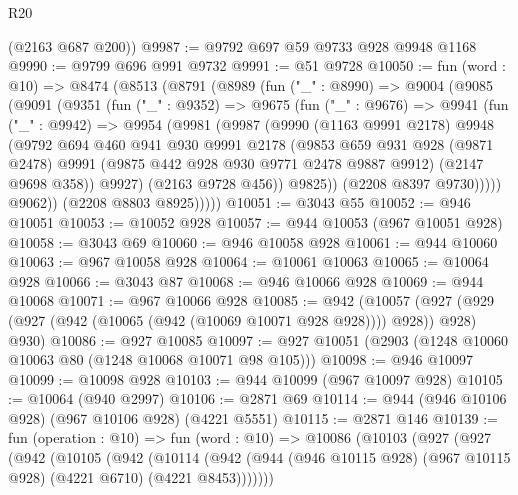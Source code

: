 \begin{lexlean}{R20}
\begin{coremodule}
      (@2163 @687 @200))
@9987 := @9792 @697 @59 @9733 @928 @9948 @1168
@9990 := @9799 @696 @991 @9732
@9991 := @51 @9728
@10050 := fun (word : @10) =>
  @8474
    (@8513
      (@8791
        (@8989
          (fun ("_" : @8990) =>
          @9004
            (@9085
              (@9091
                (@9351
                  (fun ("_" : @9352) =>
                  @9675
                    (fun ("_" : @9676) =>
                    @9941
                      (fun ("_" : @9942) =>
                      @9954
                        (@9981
                          (@9987
                            (@9990
                              (@1163 @9991 @2178)
                              @9948
                              (@9792
                                @694
                                @460
                                @941
                                @930
                                @9991
                                @2178
                                (@9853
                                  @659
                                  @931
                                  @928
                                  (@9871 @2478)
                                  @9991
                                  (@9875 @442 @928 @930 @9771 @2478 @9887 @9912)
                                  (@2147 @9698 @358))
                                @9927)
                              (@2163 @9728 @456))
                            @9825))
                        (@2208 @8397 @9730)))))
                @9062))
            (@2208 @8803 @8925)))))
@10051 := @3043 @55
@10052 := @946 @10051
@10053 := @10052 @928
@10057 := @944 @10053 (@967 @10051 @928)
@10058 := @3043 @69
@10060 := @946 @10058 @928
@10061 := @944 @10060
@10063 := @967 @10058 @928
@10064 := @10061 @10063
@10065 := @10064 @928
@10066 := @3043 @87
@10068 := @946 @10066 @928
@10069 := @944 @10068
@10071 := @967 @10066 @928
@10085 := @942
    (@10057 (@927 (@929 (@927 (@942 (@10065 (@942 (@10069 @10071 @928 @928)))) @928)) @928) @930)
@10086 := @927 @10085
@10097 := @927 @10051 (@2903 (@1248 @10060 @10063 @80 (@1248 @10068 @10071 @98 @105)))
@10098 := @946 @10097
@10099 := @10098 @928
@10103 := @944 @10099 (@967 @10097 @928)
@10105 := @10064 (@940 @2997)
@10106 := @2871 @69
@10114 := @944 (@946 @10106 @928) (@967 @10106 @928) (@4221 @5551)
@10115 := @2871 @146
@10139 := fun (operation : @10) =>
  fun (word : @10) =>
  @10086
    (@10103
      (@927
        (@927
          (@942
            (@10105
              (@942
                (@10114
                  (@942
                    (@944 (@946 @10115 @928) (@967 @10115 @928) (@4221 @6710) (@4221 @8453)))))))

\end{coremodule}
\end{lexlean}
